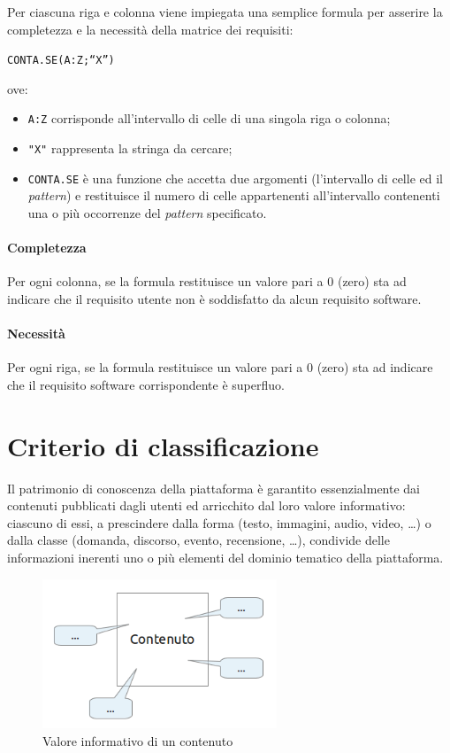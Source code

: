 Per ciascuna riga e colonna viene impiegata una semplice formula per asserire la completezza e la necessità della matrice dei requisiti:  
\begin{center}
\texttt{CONTA.SE(A:Z;``X'')}   
\end{center}
ove:
\begin{itemize}
\item \texttt{A:Z} corrisponde all'intervallo di celle di una singola riga o colonna;
\item \texttt{"X"} rappresenta la stringa da cercare;
\item \texttt{CONTA.SE} è una funzione che accetta due argomenti (l'intervallo di celle ed il \textit{pattern}) e restituisce il numero di celle appartenenti all'intervallo contenenti una o più occorrenze del \textit{pattern} specificato.
\end{itemize}

\paragraph{Completezza} Per ogni colonna, se la formula restituisce un valore pari a 0 (zero) sta ad indicare che il requisito utente non è soddisfatto da alcun requisito software.

\paragraph{Necessità} Per ogni riga, se la formula restituisce un valore pari a 0 (zero) sta ad indicare che il requisito software corrispondente è superfluo.

\section{Criterio di classificazione}
\label{sec:tesi:stage:criterio-classificazione}
Il patrimonio di conoscenza della piattaforma è garantito essenzialmente dai contenuti pubblicati dagli utenti ed arricchito dal loro valore informativo: ciascuno di essi, a prescindere dalla forma (testo, immagini, audio, video, \ldots) o dalla classe (domanda, discorso, evento, recensione, \ldots), condivide delle informazioni inerenti uno o più elementi del dominio tematico della piattaforma.

\begin{figure}[ht]
\begin{center}
 \includegraphics[width=7cm]{img/valore-informativo-contenuto.png}
 \caption{Valore informativo di un contenuto}
 \label{fig:tesi:stage:classificazione:serbatoio-contenuti}
\end{center}
\end{figure}

